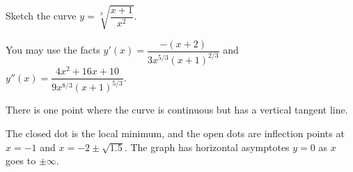 \begin{Mquestion}
Sketch the curve $y=\sqrt[3]{\dfrac{x+1}{x^2}}$.

You may use the facts  $y'(x)=\dfrac{-(x+2)}{3x^{5/3}(x+1)^{2/3}}$ and
$y''(x)=\dfrac{4x^2+16x+10}{9x^{8/3}(x+1)^{5/3}}$.
\end{Mquestion}
\begin{hint}
There is one point where the curve is continuous but has a vertical tangent line.
\end{hint}
\begin{answer}
The closed dot is the local minimum, and the open dots are inflection points at $x=-1$ and $x=-2\pm\sqrt{1.5}$. The graph has horizontal asymptotes $y=0$ as $x$ goes to $\pm \infty$.
\begin{center}\end{center}
\end{answer}

